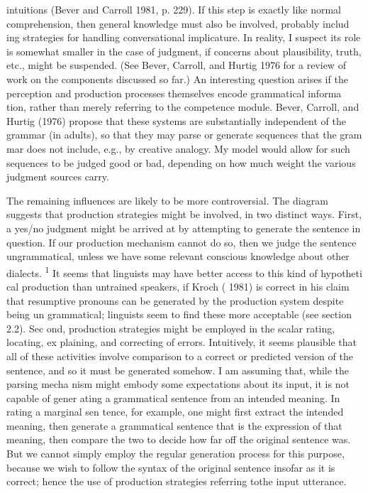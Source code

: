 \clearpage\setcounter{page}{1}\begin{styleTextbody}
intuitions{\textquotedbl} (Bever and Carroll 1981, p. 229). If this step is exactly like normal comprehension, then general knowledge must also be involved, probably includ\- ing strategies for handling conversational implicature. In reality, I suspect its role is somewhat smaller in the case of judgment, if concerns about plausibility, truth, etc., might be suspended. (See Bever, Carroll, and Hurtig 1976 for a review of work on the components discussed so far.) An interesting question arises if the perception and production processes themselves encode grammatical informa\- tion, rather than merely referring to the competence module. Bever, Carroll, and Hurtig (1976) propose that these systems are substantially independent of the grammar (in adults), so that they may parse or generate sequences that the gram\- mar does not include, e.g., by creative analogy. My model would allow for such sequences to be judged good or bad, depending on how much weight the various judgment sources carry.
\end{styleTextbody}


\begin{styleTextbody}
The remaining influences are likely to be more controversial. The diagram suggests that production strategies might be involved, in two distinct ways. First, a yes/no judgment might be arrived at by attempting to generate the sentence in question. If our production mechanism cannot do so, then we judge the sentence ungrammatical, unless we have some relevant conscious knowledge about other dialects. \textsuperscript{1}\textsuperscript{ }It seems that linguists may have better access to this kind of hypotheti\- cal production than untrained speakers, if Kroch ( 1981) is correct in his claim that resumptive pronouns can be generated by the production system despite being un\- grammatical; linguists seem to find these more acceptable (see section 2.2). Sec\- ond, production strategies might be employed in the scalar rating, locating, ex\- plaining, and correcting of errors. Intuitively, it seems plausible that all of these activities involve comparison to a correct or predicted version of the sentence, and so it must be generated somehow. I am assuming that, while the parsing mecha\- nism might embody some expectations about its input, it is not capable of gener\- ating a grammatical sentence from an intended meaning. In rating a marginal sen\- tence, for example, one might first extract the intended meaning, then generate a grammatical sentence that is the expression of that meaning, then compare the two to decide how far off the original sentence was. But we cannot simply employ the regular generation process for this purpose, because we wish to follow the syntax of the original sentence insofar as it is correct; hence the use of production strategies referring tothe input utterance.
\end{styleTextbody}


